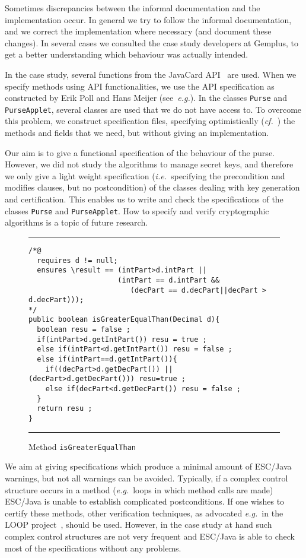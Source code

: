 \documentclass[a4paper]{llncs}
\begin{document}
Sometimes discrepancies between the informal documentation and the
implementation occur. In general we try to follow the informal
documentation, and we correct the implementation where necessary
(and document these changes). In several cases we consulted the case
study developers at Gemplus, to get a better understanding which
behaviour was actually intended.

In the case study, several functions from the JavaCard
API~\cite{JavaCardAPI} are used. When we specify methods using API
functionalities, we use the API specification as constructed by Erik
Poll and Hans Meijer (see~\emph{e.g.}\cite{MeijerP01}).  In the
classes \texttt{Purse} and \texttt{PurseApplet}, several classes are
used that we do not have access to. To overcome this problem, we
construct specification files, specifying optimistically
(\emph{cf.}~\cite{FlanaganL01}) the methods and fields that we need,
but without giving an implementation.

Our aim is to give a functional specification of the behaviour of the
purse. However, we did not study the algorithms to manage secret keys,
and therefore we only give a light weight specification
(\emph{i.e.}~specifying the precondition and modifies clauses, but no
postcondition) of the classes dealing with key generation and
certification. This enables us to write and check the specifications of
the classes \texttt{Purse} and \texttt{PurseApplet}. How to specify
and verify cryptographic algorithms is a topic of future research.

\begin{figure}[t]
\rule{\linewidth}{0.3mm}
\begin{verbatim}
/*@
  requires d != null;
  ensures \result == (intPart>d.intPart ||
                     (intPart == d.intPart && 
                        (decPart == d.decPart||decPart > d.decPart)));
*/
public boolean isGreaterEqualThan(Decimal d){
  boolean resu = false ;
  if(intPart>d.getIntPart()) resu = true ;
  else if(intPart<d.getIntPart()) resu = false ;
  else if(intPart==d.getIntPart()){
    if((decPart>d.getDecPart()) || (decPart>d.getDecPart())) resu=true ;
    else if(decPart<d.getDecPart()) resu = false ;
  }
  return resu ;
}
\end{verbatim}
\caption{Method {\tt isGreaterEqualThan}}
\label{fig-cla-dec}
\rule{\linewidth}{0.3mm}
\end{figure}

We aim at giving specifications which produce a minimal amount of
ESC/Java warnings, but not all warnings can be avoided. Typically, if
a complex control structure occurs in a method (\emph{e.g.}~loops in
which method calls are made) ESC/Java is unable to establish
complicated postconditions. If one wishes to certify these methods,
other verification techniques, as advocated \emph{e.g.}~in the LOOP
project~\cite{LOOPUrl}, should be used. However, in the case study at
hand such complex control structures are not very frequent and
ESC/Java is able to check most of the specifications without any
problems.
\end{document}
